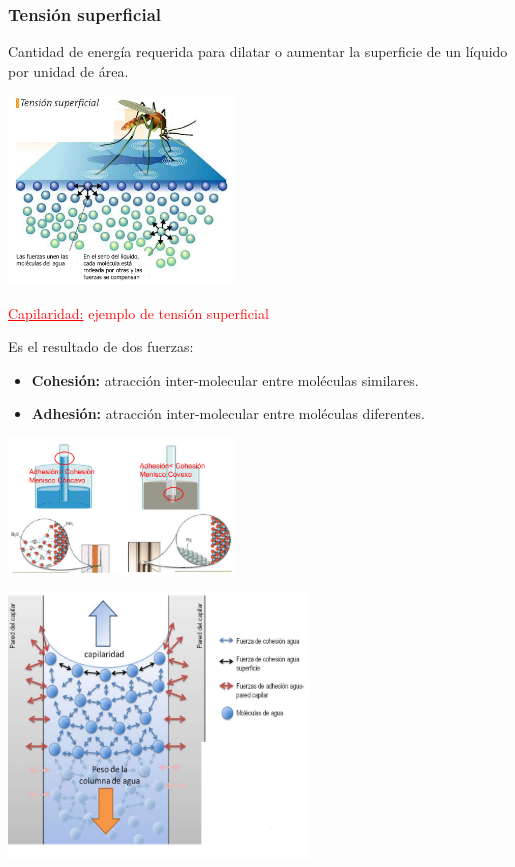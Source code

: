         \subsubsection{Tensión superficial}
            \sangria{} Cantidad de energía requerida para dilatar o aumentar la superficie de un líquido por unidad de área.
            \begin{center} \includegraphics[width=6cm]{./imagenes/mosquitoTensionSuperficial.png} \end{center}
            \begin{center} \textcolor{red}{\underline{Capilaridad:} ejemplo de tensión superficial} \end{center}
            \sangria{} Es el resultado de dos fuerzas:
            \begin{itemize}
                \item \textbf{Cohesión:} atracción inter-molecular entre moléculas similares.
                \item \textbf{Adhesión:} atracción inter-molecular entre moléculas diferentes.
            \end{itemize}
            \begin{center} \includegraphics[width=6cm]{./imagenes/fuerzasCapilaridad.png} \end{center}
            \begin{center} \includegraphics[width=8cm]{./imagenes/detallesCapilaridad1.png} \end{center}
